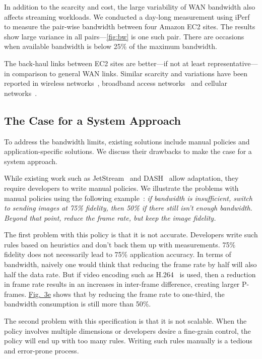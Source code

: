 In addition to the scarcity and cost, the large variability of WAN bandwidth
also affects streaming workloads. We conducted a day-long measurement using
iPerf~\cite{iperf3} to measure the pair-wise bandwidth between four Amazon EC2
sites. The results show large variance in all pairs---\autoref{fig:bw} is one
such pair. There are occasions when available bandwidth is below 25\% of the
maximum bandwidth.

The back-haul links between EC2 sites are better---if not at least
representative---in comparison to general WAN links. Similar scarcity and
variations have been reported in wireless networks~\cite{biswas2015large},
broadband access networks~\cite{grover2013peeking, sundaresan2014bismark} and
cellular networks~\cite{nikravesh2014mobile}.

\subsection{The Case for a System Approach}
\label{sec:making-case-sys-approach}

To address the bandwidth limits, existing solutions include manual policies and
application-specific solutions. We discuss their drawbacks to make the case for
a system approach.

 While existing work such as
JetStream~\cite{rabkin2014aggregation} and DASH~\cite{sodagar2011mpeg} allow
adaptation, they require developers to write manual policies. We illustrate the
problems with manual policies using the following
example~\cite{rabkin2014aggregation}: \textit{if bandwidth is insufficient,
  switch to sending images at 75\% fidelity, then 50\% if there still isn't
  enough bandwidth. Beyond that point, reduce the frame rate, but keep the image
  fidelity.}

The first problem with this policy is that it is not accurate. Developers write such rules based on heuristics and
don't back them up with measurements. 75\% fidelity does not
necessarily lead to 75\% application accuracy. In terms of bandwidth, naively
one would think that reducing the frame rate by half will also half the data
rate. But if video encoding such as H.264~\cite{richardson2011h} is used, then a reduction in frame rate results
in an increases in inter-frame difference, creating
larger P-frames. \hyperref[fig:app-specific]{Fig.~3e} shows that by reducing the
frame rate to one-third, the bandwidth consumption is still more than 50\%.

The second problem with this specification is that it is not scalable. When the policy involves multiple dimensions
or developers desire a fine-grain control, the policy will end up with too many
rules.  Writing such rules manually is a tedious and error-prone process.

